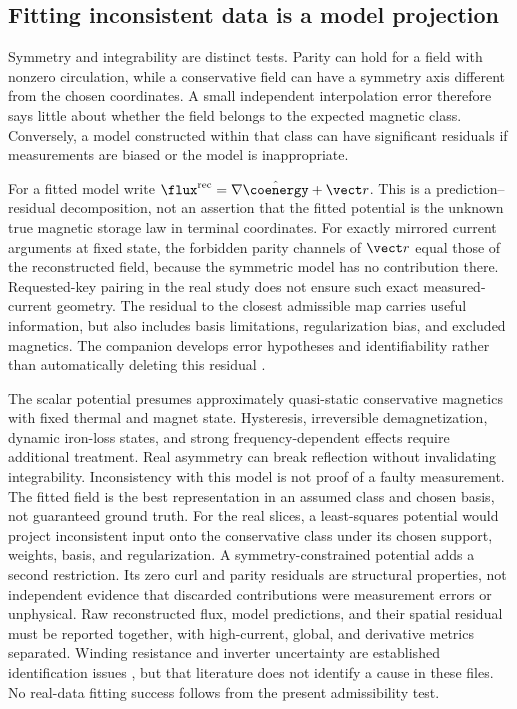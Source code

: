 \subsection{Fitting inconsistent data is a model projection}
Symmetry and integrability are distinct tests. Parity can hold for a field
with nonzero circulation, while a conservative field can have a symmetry
axis different from the chosen coordinates. A small independent interpolation
error therefore says little about whether the field belongs to the expected
magnetic class. Conversely, a model constructed within that class can have
significant residuals if measurements are biased or the model is inappropriate.

For a fitted model write $\flux^{\rm rec}=\nabla\hat\coenergy+\vect r$.
This is a prediction--residual decomposition, not an assertion that the fitted
potential is the unknown true magnetic storage law in terminal coordinates.
For exactly mirrored current arguments at fixed state, the forbidden parity
channels of $\vect r$ equal those of the reconstructed field, because the
symmetric model has no contribution there. Requested-key pairing in the real
study does not ensure such exact measured-current geometry. The residual to the closest admissible map carries useful information,
but also includes basis limitations, regularization bias, and excluded
magnetics. The companion develops error hypotheses and identifiability rather
than automatically deleting this residual \cite{companion-diagnostics}.

The scalar potential presumes approximately quasi-static conservative
magnetics with fixed thermal and magnet state. Hysteresis, irreversible
demagnetization, dynamic iron-loss states, and strong frequency-dependent
effects require additional treatment. Real asymmetry can break reflection
without invalidating integrability. Inconsistency with this model is not proof
of a faulty measurement. The fitted field is the best representation in an
assumed class and chosen basis, not guaranteed ground truth.
For the real slices, a least-squares potential would project inconsistent
input onto the conservative class under its chosen support, weights, basis,
and regularization. A symmetry-constrained potential adds a second restriction.
Its zero curl and parity residuals are structural properties, not independent
evidence that discarded contributions were measurement errors or unphysical.
Raw reconstructed flux, model predictions, and their spatial residual must be
reported together, with high-current, global, and derivative metrics separated.
Winding resistance and inverter uncertainty are established identification
issues \cite{liu2018}, but that literature does not identify a cause in these
files. No real-data fitting success follows from the present admissibility test.

